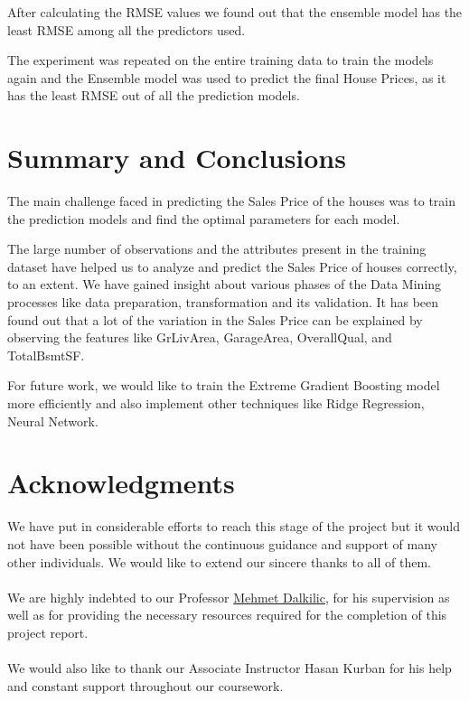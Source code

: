 \documentclass[fleqn,10pt]{SelfArx} %
\begin{document}
After calculating the RMSE values we found out that the ensemble model has the least RMSE among all the predictors used.

The experiment was repeated on the entire training data to train the models again and the Ensemble model was used to predict the final House Prices, as it has the least RMSE out of all the prediction models.



\section{Summary and Conclusions}
The main challenge faced in predicting the Sales Price of the houses was to train the prediction models and find the optimal parameters for each model.

The large number of observations and the attributes present in the training dataset have helped us to analyze and predict the Sales Price of houses correctly, to an extent. We have gained insight about various phases of the Data Mining processes like data preparation, transformation and its validation. It has been found out that a lot of the variation in the Sales Price can be explained by observing the features like GrLivArea, GarageArea, OverallQual, and TotalBsmtSF.

For future work, we would like to train the Extreme Gradient Boosting model more efficiently and also implement other techniques like Ridge Regression, Neural Network.
\section*{Acknowledgments} %

We have put in considerable efforts to reach this stage of the project but it would not have been possible without the continuous guidance and support of many other individuals. We would like to extend our sincere thanks to all of them.
\\ \\ We are highly indebted to our Professor \href{https://www.soic.indiana.edu/all-people/profile.html?profile_id=187}{Mehmet Dalkilic}, for his supervision as well as for providing the necessary resources required for the completion of this project report.
\\ \\ We would also like to thank our Associate Instructor Hasan Kurban for his help and constant support throughout our coursework.






\end{document}
